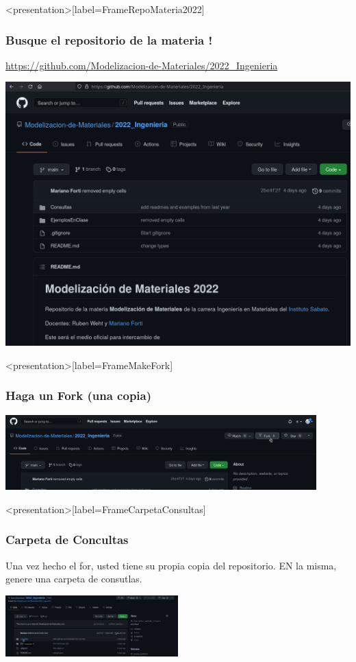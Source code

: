 \begin{frame}<presentation>[label=FrameRepoMateria2022]
  \frametitle{Busque el repositorio de la materia ! }

  \url{https://github.com/Modelizacion-de-Materiales/2022_Ingenieria}

  \includegraphics[width=\textwidth]{Screenshots/Repo2022.png}

\end{frame}

\begin{frame}<presentation>[label=FrameMakeFork]
  \frametitle{Haga un Fork (una copia)}

\centering

  \includegraphics[width=0.9\textwidth]{Screenshots/MakeFork.png}

\end{frame}

\begin{frame}<presentation>[label=FrameCarpetaConsultas]
  \frametitle{Carpeta de Concultas}

  Una vez hecho el for, usted tiene su propia copia del repositorio. EN la misma, genere una carpeta de consutlas.

  \includegraphics[width=0.5\textwidth]{Screenshots/CarpetaConsultas.png}

\end{frame}

